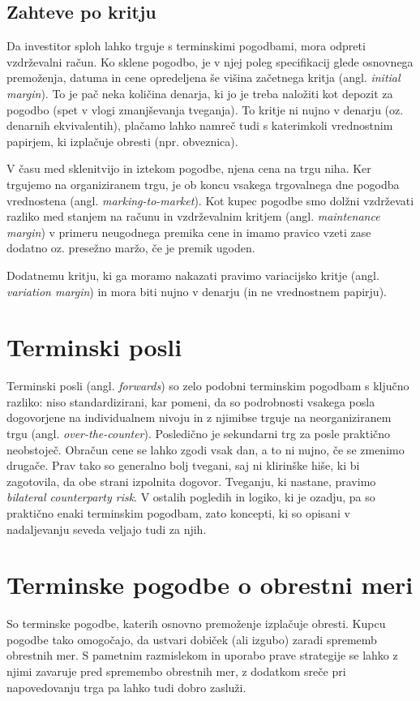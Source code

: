 \documentclass[a4paper]{article}
\begin{document}
\subsection{Zahteve po kritju}
Da investitor sploh lahko trguje s terminskimi pogodbami, mora odpreti vzdrževalni račun. 
Ko sklene pogodbo, je v njej poleg specifikacij glede osnovnega premoženja, datuma in cene 
opredeljena še višina začetnega kritja (angl. \textit{initial margin}). To je pač neka 
količina denarja, ki jo je treba naložiti kot depozit za pogodbo (spet v vlogi zmanjševanja 
tveganja). To kritje ni nujno v denarju (oz. denarnih ekvivalentih), plačamo lahko namreč 
tudi s katerimkoli vrednostnim papirjem, ki izplačuje obresti (npr. obveznica).

V času med sklenitvijo in iztekom pogodbe, njena cena na trgu niha. Ker trgujemo na organiziranem
trgu, je ob koncu vsakega trgovalnega dne pogodba vrednostena (angl. \textit{marking-to-market}). 
Kot kupec pogodbe smo dolžni vzdrževati razliko med stanjem na računu in vzdrževalnim kritjem
(angl. \textit{maintenance margin}) v primeru neugodnega premika cene in imamo pravico vzeti zase 
dodatno oz. presežno maržo, če je premik ugoden. 

Dodatnemu kritju, ki ga moramo nakazati pravimo variacijsko kritje (angl. \textit{variation margin}) 
in mora biti nujno v denarju (in ne vrednostnem papirju). 

\section{Terminski posli}
Terminski posli (angl. \textit{forwards}) so zelo podobni terminskim pogodbam s ključno razliko:
niso standardizirani, kar pomeni, da so podrobnosti vsakega posla dogovorjene na individualnem nivoju 
in z njimibse trguje na neorganiziranem trgu (angl. \textit{over-the-counter}). Posledično je sekundarni 
trg za posle praktično neobstoječ. Obračun cene se lahko zgodi vsak dan, a to ni nujno, če se zmenimo 
drugače. Prav tako so generalno bolj tvegani, saj ni klirinške hiše, ki bi zagotovila, da obe strani 
izpolnita dogovor. Tveganju, ki nastane, pravimo \textit{bilateral counterparty risk}. V ostalih pogledih
in logiko, ki je ozadju, pa so praktično enaki terminskim pogodbam, zato koncepti, ki so opisani v 
nadaljevanju seveda veljajo tudi za njih.

\section{Terminske pogodbe o obrestni meri}
So terminske pogodbe, katerih osnovno premoženje izplačuje obresti. Kupcu pogodbe tako omogočajo, da 
ustvari dobiček (ali izgubo) zaradi sprememb obrestnih mer. S pametnim razmislekom in uporabo prave 
strategije se lahko z njimi zavaruje pred spremembo obrestnih mer, z dodatkom sreče pri napovedovanju
trga pa lahko tudi dobro zasluži.
\end{document}
